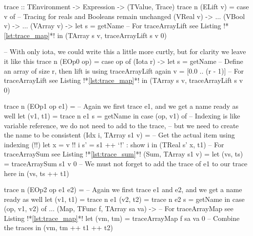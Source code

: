         \begin{haskell}[caption=Tracing away arrays, label=lst:trace_array, gobble=12]
            trace :: TEnvironment -> Expression -> (TValue, Trace)
            trace n (ELift v) =
                case v of
                    -- Tracing for reals and Booleans remain unchanged
                    (VReal  v) -> $\ldots$
                    (VBool  v) -> $\ldots$
                    (VArray v) -> let s = getName
                                  -- For traceArrayLift see Listing !*\ref{lst:trace_map}*!
                                  in  (TArray s v, traceArrayLift s v 0)
            
            -- With only iota, we could write this a little more curtly, but for clarity we leave it like this
            trace n (EOp0 op) =
                case op of
                    (Iota r) -> 
                        let s = getName
                            -- Define an array of size r, then lift is using traceArrayLift again
                            v = [0.0 .. (r - 1)]
                            -- For traceArrayLift see Listing !*\ref{lst:trace_map}*!
                        in  (TArray s v, traceArrayLift s v 0)
            
            trace n (EOp1 op e1) =
                -- Again we first trace e1, and we get a name ready as well
                let (v1, t1) = trace n e1
                    s = getName
                in  case (op, v1) of
                    -- Indexing is like variable reference, we do not need to add to the trace,
                    -- but we need to create the name to be consistent
                    (Idx i, TArray s1 v) = 
                        -- Get the actual item using indexing (!!)
                        let x  = v !! i
                            s' = s1 ++ `!' : show i
                        in  (TReal s' x, t1)
                    -- For traceArraySum see Listing !*\ref{lst:trace_sum}*!
                    (Sum, TArray s1 v) =
                        let (vs, ts) = traceArraySum s1 v 0
                        -- We must not forget to add the trace of e1 to our trace here
                        in  (vs, ts ++ t1)

            trace n (EOp2 op e1 e2) =
                -- Again we first trace e1 and e2, and we get a name ready as well
                let (v1, t1) = trace n e1
                    (v2, t2) = trace n e2
                    s = getName
                in  case (op, v1, v2) of
                    $\ldots$
                    (Map, TFunc f, TArray sa va) ->
                        -- For traceArrayMap see Listing !*\ref{lst:trace_map}*!
                        let (vm, tm) = traceArrayMap f sa va 0
                        -- Combine the traces
                        in  (vm, tm ++ t1 ++ t2)
        \end{haskell}

